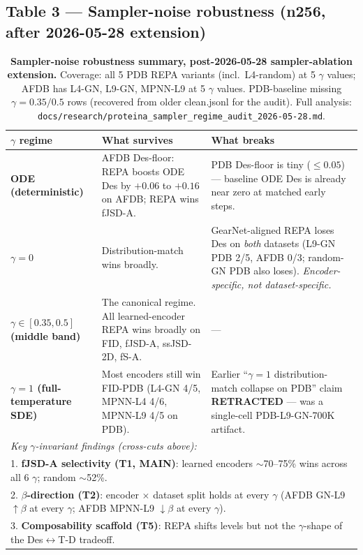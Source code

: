 \documentclass[11pt,a4paper]{article}
\begin{document}
\subsection*{Table 3 --- Sampler-noise robustness (n256, after 2026-05-28 extension)}

\begin{table}[h]
\centering
\small
\begin{tabular}{l|p{6.5cm}p{6.5cm}}
\toprule
$\gamma$ regime & What survives & What breaks \\
\midrule
\textbf{ODE (deterministic)} & AFDB Des-floor: REPA boosts ODE Des by $+0.06$ to $+0.16$ on AFDB; REPA wins fJSD-A. & PDB Des-floor is tiny ($\le 0.05$) --- baseline ODE Des is already near zero at matched early steps. \\
\textbf{$\gamma{=}0$} & Distribution-match wins broadly. & GearNet-aligned REPA loses Des on \emph{both} datasets (L9-GN PDB 2/5, AFDB 0/3; random-GN PDB also loses). \emph{Encoder-specific, not dataset-specific.} \\
\textbf{$\gamma \in [0.35, 0.5]$ (middle band)} & The canonical regime. All learned-encoder REPA wins broadly on FID, fJSD-A, ssJSD-2D, fS-A. & --- \\
\textbf{$\gamma{=}1$ (full-temperature SDE)} & Most encoders still win FID-PDB (L4-GN 4/5, MPNN-L4 4/6, MPNN-L9 4/5 on PDB). & Earlier ``$\gamma{=}1$ distribution-match collapse on PDB'' claim \textbf{RETRACTED} --- was a single-cell PDB-L9-GN-700K artifact. \\
\midrule
\multicolumn{3}{l}{\textit{Key $\gamma$-invariant findings (cross-cuts above):}}\\
\multicolumn{3}{l}{1. \textbf{fJSD-A selectivity (T1, MAIN)}: learned encoders $\sim$70--75\% wins across all 6 $\gamma$; random $\sim$52\%.}\\
\multicolumn{3}{l}{2. \textbf{$\beta$-direction (T2)}: encoder $\times$ dataset split holds at every $\gamma$ (AFDB GN-L9 $\uparrow\beta$ at every $\gamma$; AFDB MPNN-L9 $\downarrow\beta$ at every $\gamma$).}\\
\multicolumn{3}{l}{3. \textbf{Composability scaffold (T5)}: REPA shifts levels but not the $\gamma$-shape of the Des$\leftrightarrow$T-D tradeoff.}\\
\bottomrule
\end{tabular}
\caption{\textbf{Sampler-noise robustness summary, post-2026-05-28
sampler-ablation extension.} Coverage: all 5 PDB REPA variants (incl.\
L4-random) at 5 $\gamma$ values; AFDB has L4-GN, L9-GN, MPNN-L9 at 5
$\gamma$ values. PDB-baseline missing $\gamma{=}0.35/0.5$ rows
(recovered from older clean.jsonl for the audit). Full analysis:
\texttt{docs/research/proteina\_sampler\_regime\_audit\_2026-05-28.md}.}
\end{table}
\end{document}
